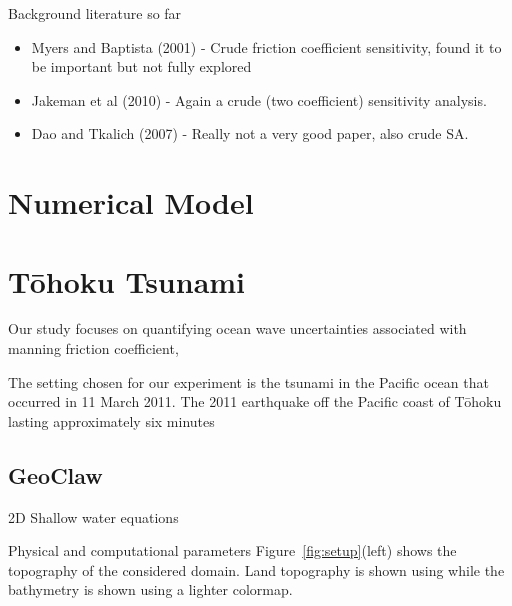 
Background literature so far
\begin{itemize}
    \item Myers and Baptista (2001) - Crude friction coefficient sensitivity, found it to be important but not fully explored
    \item Jakeman et al (2010) - Again a crude (two coefficient) sensitivity analysis.
    \item Dao and Tkalich (2007) - Really not a very good paper, also crude SA.
\end{itemize}

\section{Numerical Model}



\section{T\={o}hoku Tsunami}
Our study focuses on quantifying ocean wave uncertainties associated with 
manning friction coefficient, 

The setting chosen for our experiment is the tsunami in the Pacific ocean 
that occurred in 11 March 2011. The 2011 earthquake off the Pacific coast of Tōhoku lasting approximately six minutes


\subsection{GeoClaw}
2D Shallow water equations


Physical and computational parameters
Figure~\ref{fig:setup}(left) shows the topography of the considered domain.
Land topography is shown using while the bathymetry is shown using a lighter colormap.




